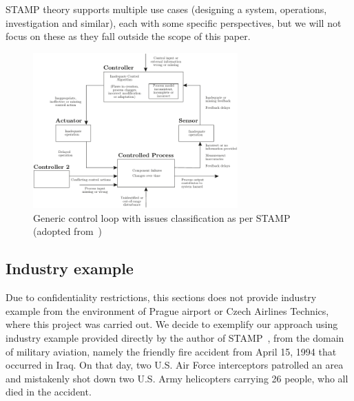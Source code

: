 \documentclass[sw]{iosart2x}
\begin{document}
STAMP theory supports multiple use cases (designing a system, operations, investigation and similar), each with some specific perspectives, but we will not focus on these as they fall outside the scope of this paper.

\begin{figure}
\begin{center}
\includegraphics[width=0.7\textwidth]{images/Fig_Loop.pdf}
\end{center}
\caption{Generic control loop with issues classification as per STAMP (adopted from~\cite{leveson2012engineering})}
\label{fig:loop}
\end{figure}


\subsection{Industry example}\label{sec:example}
Due to confidentiality restrictions, this sections does not provide industry example from the environment of Prague airport or Czech Airlines Technics, where this project was carried out. We decide to exemplify our approach using industry example provided directly by the author of STAMP~\cite{leveson2012engineering}, from the domain of military aviation, namely the friendly fire accident from April 15, 1994 that occurred in Iraq. On that day, two U.S. Air Force interceptors patrolled an area and mistakenly shot down two U.S. Army helicopters carrying 26 people, who all died in the accident. 
\end{document}
